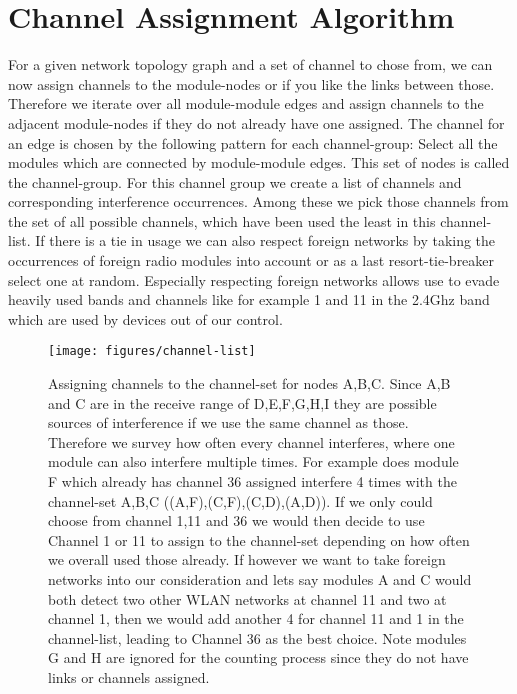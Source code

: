 \section{Channel Assignment Algorithm}
  For a given network topology graph and a set of channel to chose from, we can now assign channels to the module-nodes or if you like the links
  between those. Therefore we iterate over all module-module edges and assign channels to the adjacent module-nodes if they do not already have one assigned.
  The channel for an edge is chosen by the following pattern for each channel-group:
  Select all the modules which are connected by module-module edges. This set of nodes is called the channel-group.
  For this channel group we create a list of channels and corresponding interference occurrences.
  Among these we pick those channels from the set of all possible channels, which have been used the least in this channel-list. If there is a tie in usage
  we can also respect foreign networks by taking the occurrences of foreign radio modules into account or as a last resort-tie-breaker select one at random.
  Especially respecting foreign networks allows use to evade heavily used
  bands and channels like for example 1 and 11 in the 2.4Ghz band which are used by devices out of our control.
  \begin{figure}[h]
    \centering
    \texttt{[image: figures/channel-list]}
    \caption{Assigning channels to the channel-set for nodes A,B,C. Since A,B and C are in the receive range of D,E,F,G,H,I they are possible sources
    of interference if we use the same channel as those. Therefore we survey how often every channel interferes, where one module can also interfere multiple times.
    For example does module F which already has channel 36 assigned interfere 4 times with the channel-set A,B,C ((A,F),(C,F),(C,D),(A,D)). If we only could choose from 
    channel 1,11 and 36 we would then decide to use Channel 1 or 11 to assign to the channel-set depending on how often we overall used those already.
    If however we want to take foreign networks into our consideration and lets say modules A and C would both detect two other \ac{WLAN} networks at channel 11 and two
    at channel 1, then we would add another 4 for channel 11 and 1 in the channel-list, leading to Channel 36 as the best choice. Note modules G and H are ignored 
    for the counting process since they do not have links or channels assigned.}
    \label{fig:channel-list}
  \end{figure}
  
